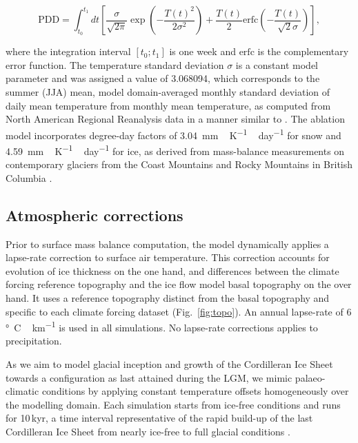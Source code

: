 \begin{equation}
	\mathrm{PDD} = \int_{t_0}^{t_1} dt \left[
		\frac{\sigma}{\sqrt{2\pi}}
		\exp\left({-\frac{T(t)^2}{2\sigma^2}}\right)
		+\frac{T(t)}{2}
		\mathrm{erfc} \left(-\frac{T(t)}{\sqrt{2}\sigma}\right)
	\right],
\end{equation}

where the integration interval $[t_0; t_1]$ is one week and $\mathrm{erfc}$ is the complementary error function. The temperature standard deviation $\sigma$ is a constant model parameter and was assigned a value of 3.068094\degC, which corresponds to the summer (JJA) mean, model domain-averaged monthly standard deviation of daily mean temperature from monthly mean temperature, as computed from North American Regional Reanalysis data \citep{data:narr} in a manner similar to \citet{seguinot-inreview}. The ablation model incorporates degree-day factors of 3.04~\unit{mm\,K^{-1}\,day^{-1}} for snow and 4.59~\unit{mm\,K^{-1}\,day^{-1}} for ice, as derived from mass-balance measurements on contemporary glaciers from the Coast Mountains and Rocky Mountains in British Columbia \citep{shea-etal-2009}.


\subsection{Atmospheric corrections}

Prior to surface mass balance computation, the model dynamically applies a lapse-rate correction to surface air temperature. This correction accounts for evolution of ice thickness on the one hand, and differences between the climate forcing reference topography and the ice flow model basal topography on the over hand. It uses a reference topography distinct from the basal topography and specific to each climate forcing dataset (Fig.~\ref{fig:topo}). An annual lapse-rate of 6\,\unit{\degree C\,km^{-1}} is used in all simulations. No lapse-rate corrections applies to precipitation.

As we aim to model glacial inception and growth of the Cordilleran Ice Sheet towards a configuration as last attained during the LGM, we mimic palaeo-climatic conditions by applying constant temperature offsets homogeneously over the modelling domain. Each simulation starts from ice-free conditions and runs for 10\,kyr, a time interval representative of the rapid build-up of the last Cordilleran Ice Sheet from nearly ice-free to full glacial conditions \citep{clague-1989,stroeven-etal-2010}.

